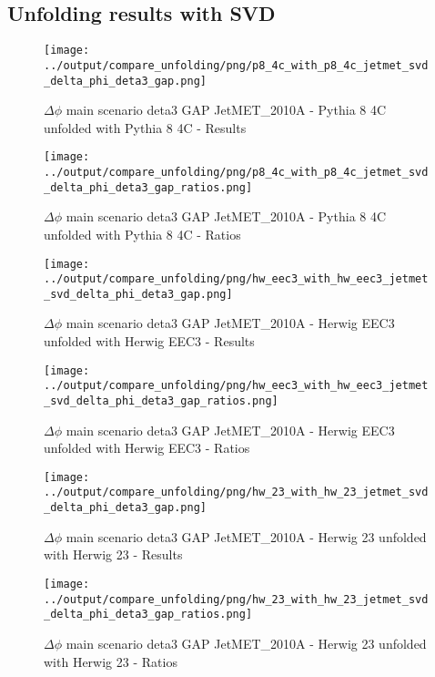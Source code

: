 \documentclass[11pt]{book}
\begin{document}
\clearpage
\subsection{Unfolding results with SVD}

\begin{figure}[ht]
\centering
\texttt{[image: ../output/compare\_unfolding/png/p8\_4c\_with\_p8\_4c\_jetmet\_svd\_delta\_phi\_deta3\_gap.png]}
\caption{$\Delta\phi$ main scenario deta3 GAP JetMET\_2010A - Pythia 8 4C unfolded with Pythia 8 4C - Results}
\label{p8_p8_jetmet_svd_delta_phi_deta3_gap_a}
\end{figure}

\begin{figure}[ht]
\centering
\texttt{[image: ../output/compare\_unfolding/png/p8\_4c\_with\_p8\_4c\_jetmet\_svd\_delta\_phi\_deta3\_gap\_ratios.png]}
\caption{$\Delta\phi$ main scenario deta3 GAP JetMET\_2010A - Pythia 8 4C unfolded with Pythia 8 4C - Ratios}
\label{p8_p8_jetmet_svd_delta_phi_deta3_gap_b}
\end{figure}

\begin{figure}[ht]
\centering
\texttt{[image: ../output/compare\_unfolding/png/hw\_eec3\_with\_hw\_eec3\_jetmet\_svd\_delta\_phi\_deta3\_gap.png]}
\caption{$\Delta\phi$ main scenario deta3 GAP JetMET\_2010A - Herwig EEC3 unfolded with Herwig EEC3 - Results}
\label{hw_eec3_hw_eec3_jetmet_svd_delta_phi_deta3_gap_a}
\end{figure}

\begin{figure}[ht]
\centering
\texttt{[image: ../output/compare\_unfolding/png/hw\_eec3\_with\_hw\_eec3\_jetmet\_svd\_delta\_phi\_deta3\_gap\_ratios.png]}
\caption{$\Delta\phi$ main scenario deta3 GAP JetMET\_2010A - Herwig EEC3 unfolded with Herwig EEC3 - Ratios}
\label{hw_eec3_hw_eec3_jetmet_svd_delta_phi_deta3_gap_b}
\end{figure}

\begin{figure}[ht]
\centering
\texttt{[image: ../output/compare\_unfolding/png/hw\_23\_with\_hw\_23\_jetmet\_svd\_delta\_phi\_deta3\_gap.png]}
\caption{$\Delta\phi$ main scenario deta3 GAP JetMET\_2010A - Herwig 23 unfolded with Herwig 23 - Results}
\label{hw_23_hw_23_jetmet_svd_delta_phi_deta3_gap_a}
\end{figure}

\begin{figure}[ht]
\centering
\texttt{[image: ../output/compare\_unfolding/png/hw\_23\_with\_hw\_23\_jetmet\_svd\_delta\_phi\_deta3\_gap\_ratios.png]}
\caption{$\Delta\phi$ main scenario deta3 GAP JetMET\_2010A - Herwig 23 unfolded with Herwig 23 - Ratios}
\label{hw_23_hw_23_jetmet_svd_delta_phi_deta3_gap_b}
\end{figure}
\end{document}
